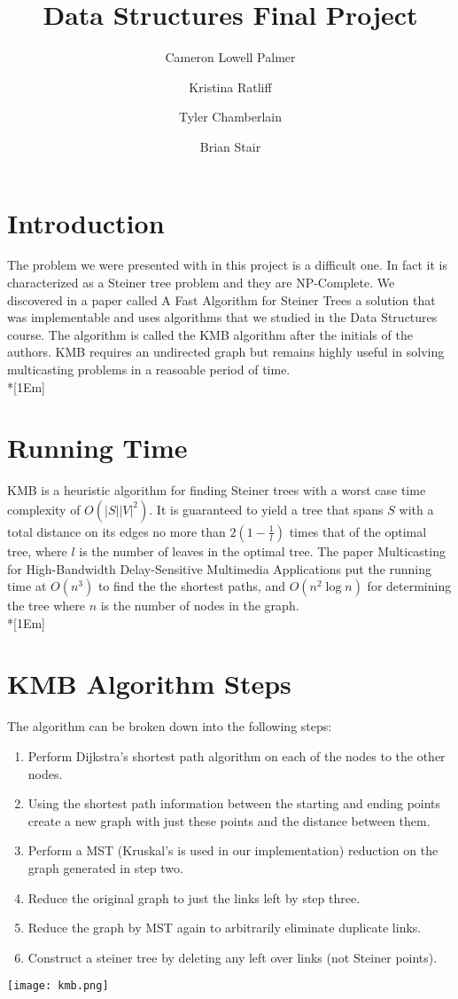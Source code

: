 \documentclass[12pt]{article}
\title{Data Structures Final Project}
\author{Cameron Lowell Palmer \and Kristina Ratliff \and Tyler Chamberlain \and Brian Stair}
\begin{document}
\maketitle
\pagebreak
\begin{raggedright}

\section*{Introduction}
The problem we were presented with in this project is a difficult one. In fact it
is characterized as a Steiner tree problem and they are NP-Complete. We discovered
in a paper called A Fast Algorithm for Steiner Trees\cite{ks:kmb} a solution that
was implementable and uses algorithms that we studied in the Data Structures course. 
The algorithm is called the KMB algorithm after the initials of the authors. KMB
requires an undirected graph but remains highly useful in solving multicasting 
problems in a reasoable period of time.\\*[1Em]

\section*{Running Time}
KMB is a heuristic algorithm for finding Steiner trees with a worst case time
complexity of $O(|S||V|^{2})$. It is guaranteed to yield a tree that spans $S$ with a
total distance on its edges no more than $2(1 - \frac{1}{l})$ times that of the optimal
tree, where $l$ is the number of leaves in the optimal tree. The paper Multicasting
for High-Bandwidth Delay-Sensitive Multimedia Applications\cite{ks:kpp} put the
running time at $O(n^{3})$ to find the the shortest paths, and $O(n^{2} \log n)$ for
determining the tree where $n$ is the number of nodes in the graph.\\*[1Em]

\section*{KMB Algorithm Steps}
The algorithm can be broken down into the following steps:
\begin{enumerate}
\item Perform Dijkstra's shortest path algorithm on each of the nodes to the other nodes.
\item Using the shortest path information between the starting and ending points create a new graph with just these points and the distance between them.
\item Perform a MST (Kruskal's is used in our implementation) reduction on the graph generated in step two.
\item Reduce the original graph to just the links left by step three.
\item Reduce the graph by MST again to arbitrarily eliminate duplicate links.
\item Construct a steiner tree by deleting any left over links (not Steiner points).
\end{enumerate}
\texttt{[image: kmb.png]}


\end{raggedright}
\end{document}

